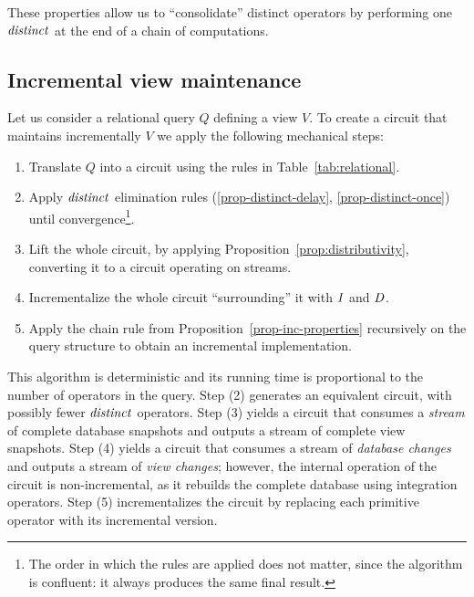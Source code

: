 These properties allow us to ``consolidate'' distinct operators by performing
one $\mathit{distinct}$ at the end of a chain of computations.

\subsection{Incremental view maintenance}

Let us consider a relational query $Q$ defining a view $V$.  To create
a circuit that maintains incrementally $V$ we apply the following
mechanical steps:

\begin{algorithm}\label{algorithm-inc}\quad
\begin{enumerate}
    \item Translate $Q$ into a circuit using the rules in Table~\ref{tab:relational}.
    \item Apply $\mathit{distinct}$ elimination rules (\ref{prop-distinct-delay}, \ref{prop-distinct-once}) until convergence\footnote{The
    order in which the rules are applied does not matter, since the algorithm is
    confluent: it always produces the same final result.}.
    \item Lift the whole circuit, by applying Proposition~\ref{prop:distributivity},
    converting it to a circuit operating on streams.
    \item Incrementalize the whole circuit ``surrounding'' it with $\mathit{I}$ and $\mathit{D}$.
    \item Apply the chain rule
    from Proposition~\ref{prop-inc-properties} recursively on the query structure
    to obtain an incremental implementation.
\end{enumerate}
\end{algorithm}

This algorithm is deterministic and its running time
is proportional to the number of operators in the query.
Step (2) generates an equivalent circuit, with possibly fewer
$\mathit{distinct}$ operators.  Step (3) yields a circuit that consumes a
\emph{stream} of complete database snapshots and outputs a stream of
complete view snapshots. Step (4) yields a circuit that consumes a
stream of \emph{database changes} and outputs a stream of \emph{view
changes}; however, the internal operation of the circuit is
non-incremental, as it rebuilds the complete database using
integration operators.  Step (5) incrementalizes the circuit by
replacing each primitive operator with its incremental version.

